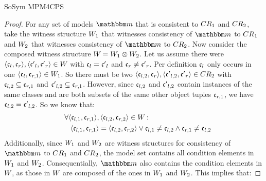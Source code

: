 \begin{copiedFrom}{SoSym MPM4CPS}
\begin{proof}
    For any set of models $\modelset{m}$ that is consistent to $CR_{1}$ and $CR_{2}$, take the witness structure $W_{1}$ that witnesses consistency of $\modelset{m}$ to $CR_{1}$ and $W_{2}$ that witnesses consistency of $\modelset{m}$ to $CR_{2}$.
    Now consider the composed witness structure $W_{} = W_{1} \otimes W_{2}$.
    Let us assume there were $\langle \mathfrak{c}_{l}, \mathfrak{c}_{r} \rangle, \langle \mathfrak{c'}_{l}, \mathfrak{c'}_{r} \rangle \in W_{}$ with $\mathfrak{c}_{l} = \mathfrak{c'}_{l}$ and $\mathfrak{c}_{r} \neq \mathfrak{c'}_{r}$.
    Per definition $\mathfrak{c}_{l}$ only occurs in one $\langle \mathfrak{c}_{l}, \mathfrak{c}_{r,1} \rangle \in W_{1}$.
    So there must be two $\langle \mathfrak{c}_{l,2}, \mathfrak{c}_{r} \rangle, \langle \mathfrak{c'}_{l,2}, \mathfrak{c'}_{r} \rangle \in CR_{2}$ with $\mathfrak{c}_{l,2} \subseteq \mathfrak{c}_{r,1}$ and $\mathfrak{c'}_{l,2} \subseteq \mathfrak{c}_{r,1}$.
    However, since $\mathfrak{c}_{l,2}$ and $\mathfrak{c'}_{l,2}$ contain instances of the same classes and are both subsets of the same other object tuples $\mathfrak{c}_{r,1}$, we have $\mathfrak{c}_{l,2} = \mathfrak{c'}_{l,2}$.
    So we know that:
    \begin{align*}
        \formulaskip &
        \forall \tupled{\conditionelement{c}{l,1}, \conditionelement{c}{r,1}}, \tupled{\conditionelement{c}{l,2}, \conditionelement{c}{r,2}} \in \consistencyrelation{W}{} : \\
        & \formulaskip
        \tupled{\conditionelement{c}{l,1}, \conditionelement{c}{r,1}} = \tupled{\conditionelement{c}{l,2}, \conditionelement{c}{r,2}} \lor \conditionelement{c}{l,1} \neq \conditionelement{c}{l,2} \land \conditionelement{c}{r,1} \neq \conditionelement{c}{l,2}
    \end{align*}
    Additionally, since $W_{1}$ and $W_{2}$ are witness structures for consistency of $\modelset{m}$ to $CR_{1}$ and $CR_{2}$, the model set contains all condition elements in $W_{1}$ and $W_{2}$.
    Consequentially, $\modelset{m}$ also contains the condition elements in $W_{}$, as those in $W_{}$ are composed of the ones in $W_{1}$ and $W_{2}$. This implies that:

\end{proof}
\end{copiedFrom}
